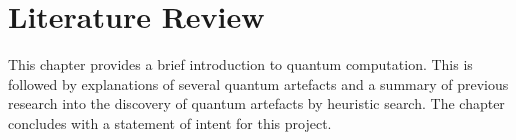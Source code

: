 \chapter{Literature Review}
\label{sec:introtoquantcomp}
% 

This chapter provides a brief introduction to quantum computation.
This is followed by explanations of several quantum artefacts and a summary of previous research into the discovery of quantum artefacts by heuristic search.
The chapter concludes with a statement of intent for this project.

